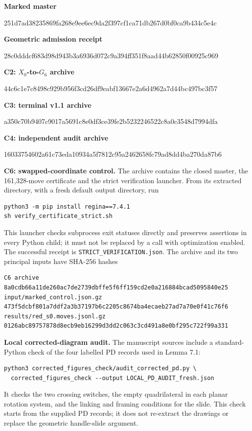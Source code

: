 \documentclass[11pt,letterpaper]{article}
\begin{document}
\smallskip\textbf{Marked master}\par
{\small\ttfamily 251d7ad38235869fa268e9ee6ec9da2f397cf1ca71db267d0bf0ca9b434c5e4c\par}
\smallskip\textbf{Geometric admission receipt}\par
{\small\ttfamily 28c0dddcf683d98d943b3a6936d072c9a394ff351f8aad44b62850f00925c969\par}
\smallskip\textbf{C2: $X_0$-to-$G_6$ archive}\par
{\small\ttfamily 44c6c1e7c8498c929b956f3cd26df9eabf13667e2a6d4962a7d44bc497bc3f57\par}
\smallskip\textbf{C3: terminal v1.1 archive}\par
{\small\ttfamily a350c70b9407c9017a5691c8e0df3ce39fe2b5232246522c8a0c3548d7994dfa\par}
\smallskip\textbf{C4: independent audit archive}\par
{\small\ttfamily 16033754602a61c73eda10934a5f7812c95a2462658fc79ad8dd4ba270da87b6\par}
\smallskip\textbf{C6: swapped-coordinate control.} The archive  contains the closed master, the 161,328-move certificate and the strict verification launcher. From its extracted directory, with a fresh default output directory, run
\begin{Verbatim}
python3 -m pip install regina==7.4.1
sh verify_certificate_strict.sh
\end{Verbatim}
This launcher checks subprocess exit statuses directly and preserves assertions in every Python child; it must not be replaced by a call with optimization enabled. The successful receipt is \texttt{STRICT\_VERIFICATION.json}. The archive and its two principal inputs have SHA-256 hashes
\begin{Verbatim}
C6 archive
8a0cdb66a11de260ac7de2739dbffe5f6ff159cd2e0a216884bcad5095840e25
input/marked_control.json.gz
473f5dcbf801a7ddf2a3b37197b6c2205c8674ba4ecaeb27ad7a70e0f41c76f6
results/red_s0.moves.jsonl.gz
0126abc89757878d8ecb9eb16299d3dd2c063c3cd491a8e0bf295c722f99a331
\end{Verbatim}

\smallskip\textbf{Local corrected-diagram audit.} The manuscript sources include a standard-Python check of the four labelled PD records used in Lemma 7.1:
\begin{Verbatim}
python3 corrected_figures_check/audit_corrected_pd.py \
  corrected_figures_check --output LOCAL_PD_AUDIT_fresh.json
\end{Verbatim}
It checks the two crossing switches, the empty quadrilateral in each planar rotation system, and the linking and framing conditions for the slide. This check starts from the supplied PD records; it does not re-extract the drawings or replace the geometric handle-slide argument.
\end{document}
